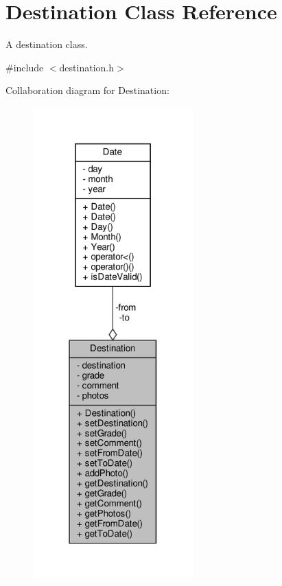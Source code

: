 \hypertarget{class_destination}{}\section{Destination Class Reference}
\label{class_destination}


A destination class.  




{\ttfamily \#include $<$destination.\+h$>$}



Collaboration diagram for Destination\+:\nopagebreak
\begin{figure}[H]
\begin{center}
\leavevmode
\includegraphics[width=175pt]{class_destination__coll__graph}
\end{center}
\end{figure}
